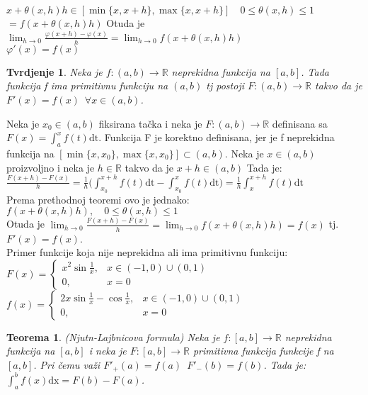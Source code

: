 \documentclass{article}
\newtheorem{teorema}{Teorema}[section]
\newtheorem{tvr}{Tvrdjenje}[section]
\begin{document}
$x+\theta(x,h)h \in [\min\{x, x+h\}, \max\{x, x+h\}]\quad 0 \leq \theta(x, h) \leq 1$\\
$= f(x+\theta(x, h)h)$ Otuda je $\displaystyle \lim_{h\rightarrow 0}\frac{\varphi(x+h) - \varphi(x)}{h} = \lim_{h\rightarrow 0} f(x+\theta(x, h)h)$\\
$\varphi'(x) = f(x)$
\begin{tvrbox}
    \begin{tvr}
        Neka je $f: (a, b) \rightarrow \mathbb{R}$ neprekidna funkcija na $[a, b]$. Tada funkcija f ima primitivnu funkciju na $(a, b)$ tj postoji $F: (a, b) \rightarrow \mathbb{R}$ takvo da je $F'(x) = f(x)\,\,\, \forall x\in (a, b)$.
    \end{tvr}
\end{tvrbox}
Neka je $x_0\in(a, b)$ fiksirana tačka i neka je $F:(a, b) \rightarrow \mathbb{R}$ definisana sa $F(x) = \displaystyle\int^x_a f(t)\text{dt}$. Funkcija F je korektno definisana, jer je f neprekidna funkcija na $[\min\{x, x_0\}, \max\{x, x_0\}]\subset(a, b)$. Neka je $x\in(a, b)$ proizvoljno i neka je $h\in\mathbb{R}$ takvo da je $x+h\in(a, b)$ Tada je:\\
$\displaystyle \frac{F(x+h)-F(x)}{h} = \frac{1}{h}\bigg(\int^{x+h}_{x_0} f(t)\text{dt} - \int^{x}_{x_0} f(t)\text{dt}\bigg) = \frac{1}{h}\int^{x+h}_x f(t)\text{dt}$\\
Prema prethodnoj teoremi ovo je jednako: $f(x+\theta(x, h)h),\quad 0\leq \theta(x, h)\leq 1$\\
Otuda je $\displaystyle \lim_{h\rightarrow 0}\frac{F(x+h)-F(x)}{h} = \lim_{h\rightarrow 0} f(x+\theta(x, h)h) = f(x)$ tj. $F'(x) = f(x)$.\\
Primer funkcije koja nije neprekidna ali ima primitivnu funkciju:\\
$F(x) = \begin{cases}
        x^2\sin\frac{1}{x}, & x\in (-1,0)\cup(0, 1) \\
        0,                  & x = 0
    \end{cases}$\\
$f(x) = \begin{cases}
        2x\sin\frac{1}{x} - \cos\frac{1}{x}, & x\in(-1,0)\cup(0,1) \\
        0,                                   & x = 0
    \end{cases}$
\begin{teoremabox}
    \begin{teorema}
        (Njutn-Lajbnicova formula) Neka je $f:[a, b]\rightarrow \mathbb{R}$ neprekidna funkcija na $[a,b]$ i neka je $F:[a, b]\rightarrow\mathbb{R}$ primitivna funkcija funkcije f na $[a,b]$. Pri čemu važi $F'_+ (a) = f(a)\,\,\,F'_-(b) = f(b)$. Tada je: $\displaystyle \int^b_a f(x)\text{dx} = F(b) - F(a)$.
    \end{teorema}
\end{teoremabox}
\end{document}
